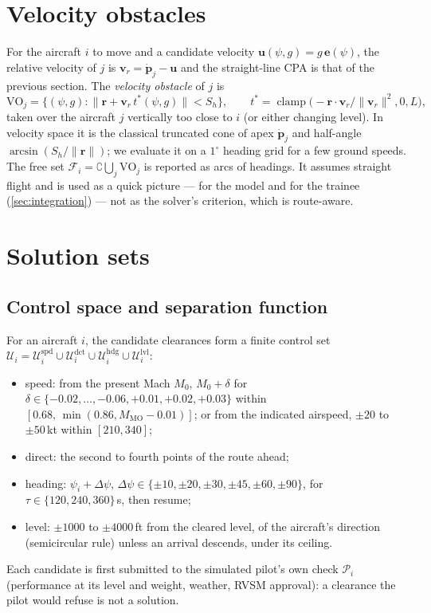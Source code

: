 \documentclass[11pt,a4paper]{article}
\newcommand{\clamp}{\operatorname{clamp}}
\newcommand{\Sh}{S_h}
\begin{document}
\section{Velocity obstacles}\label{sec:vo}

For the aircraft $i$ to move and a candidate velocity $\bm u(\psi,g) = g\,\bm e(\psi)$, the relative velocity of
$j$ is $\bm v_r = \dot{\bm p}_j - \bm u$ and the straight-line CPA is that of the previous section. The
\emph{velocity obstacle} of $j$ is
\begin{equation}
\mathrm{VO}_j = \{(\psi,g) : \|\bm r + \bm v_r\,t^*(\psi,g)\| < \Sh\},\qquad
t^* = \clamp\!\big(-\bm r\cdot\bm v_r/\|\bm v_r\|^2, 0, L\big),
\end{equation}
taken over the aircraft $j$ vertically too close to $i$ (or either changing level). In velocity space it is the
classical truncated cone of apex $\dot{\bm p}_j$ and half-angle $\arcsin(\Sh/\|\bm r\|)$; we evaluate it on a
$1^\circ$ heading grid for a few ground speeds. The free set $\mathcal F_i = \complement\bigcup_j \mathrm{VO}_j$ is
reported as arcs of headings. It assumes straight flight and is used as a quick picture --- for the model and for
the trainee (\cref{sec:integration}) --- not as the solver's criterion, which is route-aware.

\section{Solution sets}\label{sec:sets}

\subsection{Control space and separation function}

For an aircraft $i$, the candidate clearances form a finite control set
$\mathcal U_i = \mathcal U^{\mathrm{spd}}_i\cup\mathcal U^{\mathrm{dct}}_i\cup\mathcal U^{\mathrm{hdg}}_i\cup\mathcal U^{\mathrm{lvl}}_i$:
\begin{itemize}
\item speed: from the present Mach $M_0$, $M_0+\delta$ for $\delta\in\{-0.02,\dots,-0.06,+0.01,+0.02,+0.03\}$
within $[0.68,\,\min(0.86, M_{\mathrm{MO}}-0.01)]$; or from the indicated airspeed, $\pm20$ to $\pm50$\,kt within
$[210,340]$;
\item direct: the second to fourth points of the route ahead;
\item heading: $\psi_i+\Delta\psi$, $\Delta\psi\in\{\pm10,\pm20,\pm30,\pm45,\pm60,\pm90\}$, for
$\tau\in\{120,240,360\}$\,s, then resume;
\item level: $\pm1000$ to $\pm4000$\,ft from the cleared level, of the aircraft's direction (semicircular rule)
unless an arrival descends, under its ceiling.
\end{itemize}
Each candidate is first submitted to the simulated pilot's own check $\mathcal P_i$ (performance at its level and
weight, weather, RVSM approval): a clearance the pilot would refuse is not a solution.
\end{document}
